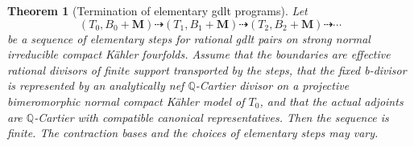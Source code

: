 \documentclass[11pt]{amsart}
\newtheorem{theorem}{Theorem}[section]
\theoremstyle{definition}
\theoremstyle{remark}
\numberwithin{equation}{section}
\newcommand{\Q}{\mathbb{Q}}
\newcommand{\M}{\mathbf{M}}
\begin{document}
\begin{theorem}[Termination of elementary gdlt programs]\label{thm:gdlt}
Let
\[
 (T_0,B_0+\M)\dashrightarrow(T_1,B_1+\M)
 \dashrightarrow(T_2,B_2+\M)\dashrightarrow\cdots
\]
be a sequence of elementary steps for rational gdlt pairs on strong normal irreducible
compact K\"ahler fourfolds.  Assume that the boundaries are effective
rational divisors of finite support transported by the steps, that the
fixed b-divisor is represented by an analytically nef \(\Q\)-Cartier divisor
on a projective bimeromorphic normal compact K\"ahler model of \(T_0\), and
that the actual adjoints are \(\Q\)-Cartier with compatible canonical
representatives.  Then the sequence is finite.  The contraction bases and
the choices of elementary steps may vary.
\end{theorem}
\end{document}
